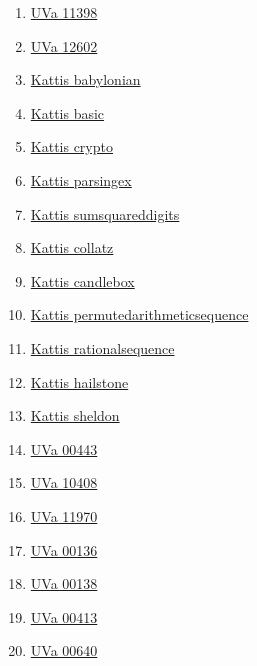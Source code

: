 \begin{enumerate}
\item \href{https://onlinejudge.org/index.php?option=com_onlinejudge&Itemid=8&page=show_problem&problem=2393}{UVa 11398}
\item \href{https://onlinejudge.org/index.php?option=com_onlinejudge&Itemid=8&page=show_problem&problem=4280}{UVa 12602}
\item \href{https://open.kattis.com/problems/babylonian}{Kattis babylonian}
\item \href{https://open.kattis.com/problems/basic}{Kattis basic}
\item \href{https://open.kattis.com/problems/crypto}{Kattis crypto}
\item \href{https://open.kattis.com/problems/parsingex}{Kattis parsingex}
\item \href{https://open.kattis.com/problems/sumsquareddigits}{Kattis sumsquareddigits}
\item \href{https://open.kattis.com/problems/collatz}{Kattis collatz}
\item \href{https://open.kattis.com/problems/candlebox}{Kattis candlebox}
\item \href{https://open.kattis.com/problems/permutedarithmeticsequence}{Kattis permutedarithmeticsequence}
\item \href{https://open.kattis.com/problems/rationalsequence}{Kattis rationalsequence}
\item \href{https://open.kattis.com/problems/hailstone}{Kattis hailstone}
\item \href{https://open.kattis.com/problems/sheldon}{Kattis sheldon}
\item \href{https://onlinejudge.org/index.php?option=com_onlinejudge&Itemid=8&page=show_problem&problem=384}{UVa 00443}
\item \href{https://onlinejudge.org/index.php?option=com_onlinejudge&Itemid=8&page=show_problem&problem=1349}{UVa 10408}
\item \href{https://onlinejudge.org/index.php?option=com_onlinejudge&Itemid=8&page=show_problem&problem=3121}{UVa 11970}
\item \href{https://onlinejudge.org/index.php?option=com_onlinejudge&Itemid=8&page=show_problem&problem=72}{UVa 00136}
\item \href{https://onlinejudge.org/index.php?option=com_onlinejudge&Itemid=8&page=show_problem&problem=74}{UVa 00138}
\item \href{https://onlinejudge.org/index.php?option=com_onlinejudge&Itemid=8&page=show_problem&problem=354}{UVa 00413}
\item \href{https://onlinejudge.org/index.php?option=com_onlinejudge&Itemid=8&page=show_problem&problem=581}{UVa 00640}

\end{enumerate}
